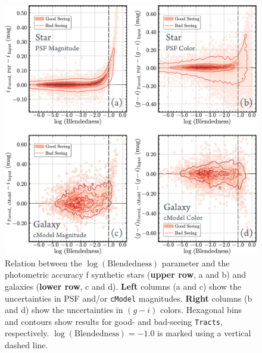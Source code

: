\documentclass[useamsfonts]{pasj01}
\def\cmodel{\texttt{cModel}}
\def\tracts{\texttt{Tracts}}
\begin{document}
\begin{figure}
    \begin{center}
        \includegraphics[width=\textwidth]{fig/synpipe_blendedness_err}
    \end{center}
    \caption{
        Relation between the $\log(\mathrm{Blendedness})$ parameter
        and the photometric accuracy f synthetic stars (\textbf{upper row}, a and 
        b) and galaxies (\textbf{lower row}, c and d).
        \textbf{Left} columns (a and c) show the uncertainties in PSF and/or \cmodel{} 
        magnitudes. \textbf{Right} columns (b and d) show the uncertainties in 
        $(g-i)$ colors.
        Hexagonal bins and contours show results for good- and bad-seeing
        \tracts{}, respectively.
        $\log(\mathrm{Blendedness}) = -1.0$ is marked using a vertical dashed line.
        }
    \label{fig:blend}
\end{figure}
\end{document}
